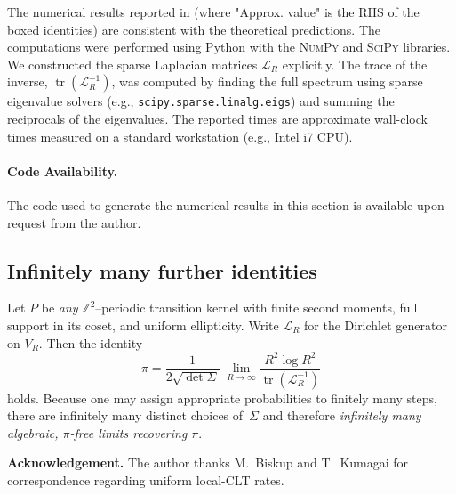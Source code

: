 \documentclass[12pt]{amsart}
\theoremstyle{definition}
\theoremstyle{remark}
\DeclareMathOperator{\tr}{tr}    %
\begin{document}
The numerical results reported in  (where "Approx. value" is the RHS of the boxed identities) are consistent with the theoretical predictions. The computations were performed using Python with the \textsc{NumPy} and \textsc{SciPy} libraries. We constructed the sparse Laplacian matrices $\mathcal{L}_R$ explicitly. The trace of the inverse, $\tr(\mathcal{L}_R^{-1})$, was computed by finding the full spectrum using sparse eigenvalue solvers (e.g., \texttt{scipy.sparse.linalg.eigs}) and summing the reciprocals of the eigenvalues. The reported times are approximate wall-clock times measured on a standard workstation (e.g., Intel i7 CPU).

\paragraph{Code Availability.} The code used to generate the numerical results in this section is available upon request from the author.


\subsection{Infinitely many further identities}\label{app:infinite}

Let \(P\) be \emph{any} $\mathbb Z^{2}$–periodic transition kernel
with finite second moments, full support in its coset, and
uniform ellipticity.
Write \( \mathcal{L}_R \) for the Dirichlet generator on \( V_R \).
Then the identity
\[
\pi=\frac{1}{2\sqrt{\det\Sigma}}\;
      \lim_{R\to\infty}
      \frac{R^{2}\log R^{2}}{\tr(\mathcal{L}_R^{-1})}
\]
holds.
Because one may assign appropriate probabilities to
finitely many steps, there are infinitely many distinct choices of~\(\Sigma\) and therefore
\emph{infinitely many algebraic, $\pi$-free limits recovering $\pi$}.


\bigskip
\noindent\textbf{Acknowledgement.}
The author thanks M.\ Biskup and T.\ Kumagai for correspondence regarding uniform local-CLT rates.
\end{document}
